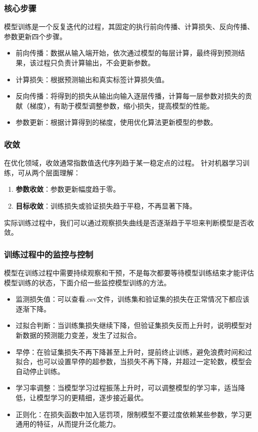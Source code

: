 \documentclass[12pt]{article}
\begin{document}
\subsubsection{核心步骤}
模型训练是一个反复迭代的过程，其固定的执行前向传播、计算损失、反向传播、参数更新四个步骤。
\begin{itemize}
    \item 前向传播：数据从输入端开始，依次通过模型的每层计算，最终得到预测结果，该过程只负责计算输出，不会更新参数。
    \item 计算损失：根据预测输出和真实标签计算损失值。
    \item 反向传播：将得到的损失从输出向输入逐层传播，计算每一层参数对损失的贡献（梯度），有助于模型调整参数，缩小损失，提高模型的性能。
    \item 参数更新：根据计算得到的梯度，使用优化算法更新模型的参数。
    
\end{itemize}

\subsubsection{收敛}
在优化领域，收敛通常指数值迭代序列趋于某一稳定点的过程。
针对机器学习训练，可从两个层面理解：
\begin{enumerate}
    \item \textbf{参数收敛}：参数更新幅度趋于零。
    \item \textbf{目标收敛}：训练损失或验证损失趋于平稳，不再显著下降。
\end{enumerate}
实际训练过程中，我们可以通过观察损失曲线是否逐渐趋于平坦来判断模型是否收敛。
\subsubsection{训练过程中的监控与控制}
模型在训练过程中需要持续观察和干预，不是每次都要等待模型训练结束才能评估模型训练的状态，下面介绍一些监控模型训练的方法。
\begin{itemize}
    \item 监测损失值：可以查看.csv文件，训练集和验证集的损失在正常情况下都应该逐渐下降。
    \item 过拟合判断：当训练集损失继续下降，但验证集损失反而上升时，说明模型对新数据的预测能力变差，发生了过拟合。
    \item 早停：在验证集损失不再下降甚至上升时，提前终止训练，避免浪费时间和过拟合，也可以设置早停的超参数，当损失不再下降，并超过一定轮数，模型会自动停止训练。
    \item 学习率调整：当模型学习过程振荡上升时，可以调整模型的学习率，适当降低，让模型学习的更精细，逐步接近最优。
    \item 正则化：在损失函数中加入惩罚项，限制模型不要过度依赖某些参数，学习更通用的特征，从而提升泛化能力。
\end{itemize}
\end{document}
